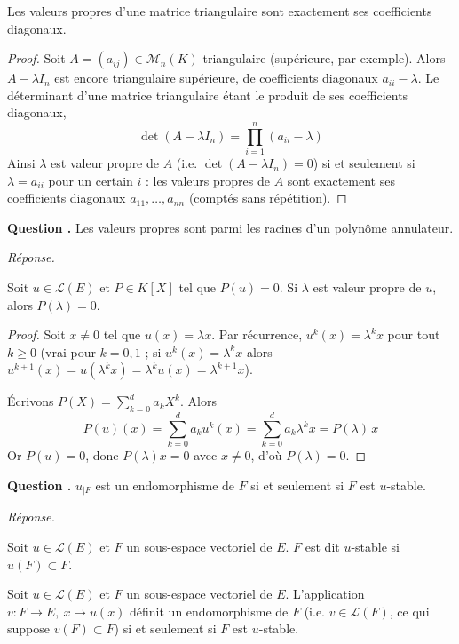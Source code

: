 \documentclass[11pt]{article}
\newcounter{qnum}
\newcommand{\question}[1]{%
\stepcounter{qnum}%
\bigskip
\noindent\textbf{Question \theqnum.} #1\par}
\newcommand{\reponse}{\noindent\textit{Réponse.}\ }
\begin{document}
\begin{prop}
Les valeurs propres d'une matrice triangulaire sont exactement ses coefficients diagonaux.
\end{prop}

\begin{proof}
Soit $A=(a_{ij})\in\mathcal{M}_n(K)$ triangulaire (supérieure, par exemple). Alors $A-\lambda I_n$ est encore triangulaire supérieure, de coefficients diagonaux $a_{ii}-\lambda$. Le déterminant d'une matrice triangulaire étant le produit de ses coefficients diagonaux,
\[\det(A-\lambda I_n) = \prod_{i=1}^{n} (a_{ii}-\lambda)\]
Ainsi $\lambda$ est valeur propre de $A$ (i.e. $\det(A-\lambda I_n)=0$) si et seulement si $\lambda=a_{ii}$ pour un certain $i$ : les valeurs propres de $A$ sont exactement ses coefficients diagonaux $a_{11},\dots,a_{nn}$ (comptés sans répétition).
\end{proof}

\question{Les valeurs propres sont parmi les racines d'un polynôme annulateur.}
\reponse
\begin{prop}
Soit $u\in\mathcal{L}(E)$ et $P\in K[X]$ tel que $P(u)=0$. Si $\lambda$ est valeur propre de $u$, alors $P(\lambda)=0$.
\end{prop}

\begin{proof}
Soit $x\neq 0$ tel que $u(x)=\lambda x$. Par récurrence, $u^k(x)=\lambda^k x$ pour tout $k\geq 0$ (vrai pour $k=0,1$ ; si $u^k(x)=\lambda^k x$ alors $u^{k+1}(x)=u(\lambda^k x)=\lambda^k u(x)=\lambda^{k+1}x$).

Écrivons $P(X)=\sum_{k=0}^{d} a_k X^k$. Alors
\[P(u)(x) = \sum_{k=0}^{d} a_k u^k(x) = \sum_{k=0}^{d} a_k \lambda^k x = P(\lambda)\, x\]
Or $P(u)=0$, donc $P(\lambda)x=0$ avec $x\neq 0$, d'où $P(\lambda)=0$.
\end{proof}

\question{$u_{|F}$ est un endomorphisme de $F$ si et seulement si $F$ est $u$-stable.}
\reponse
\begin{defi}
Soit $u\in\mathcal{L}(E)$ et $F$ un sous-espace vectoriel de $E$. $F$ est dit $u$-stable si $u(F)\subset F$.
\end{defi}

\begin{prop}
Soit $u\in\mathcal{L}(E)$ et $F$ un sous-espace vectoriel de $E$. L'application $v:F\to E,\ x\mapsto u(x)$ définit un endomorphisme de $F$ (i.e. $v\in\mathcal{L}(F)$, ce qui suppose $v(F)\subset F$) si et seulement si $F$ est $u$-stable.
\end{prop}
\end{document}
